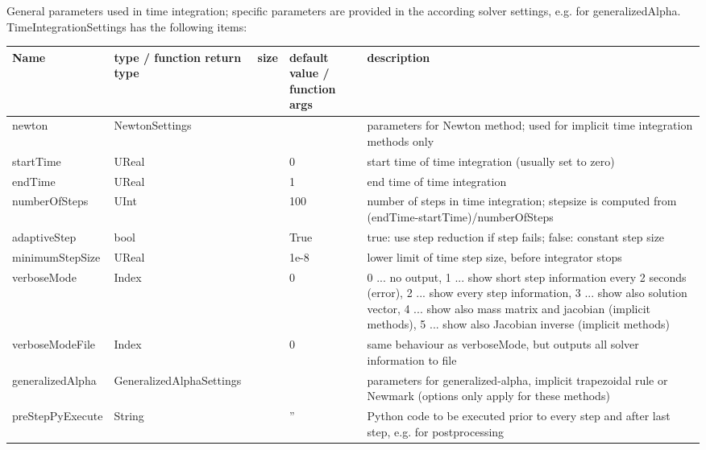  \label{sec_TimeIntegrationSettings}
General parameters used in time integration; specific parameters are provided in the according solver settings, e.g. for generalizedAlpha.\\ 
%
TimeIntegrationSettings has the following items:
\begin{center}
  \footnotesize
  \begin{longtable}{| p{4.2cm} | p{2.5cm} | p{0.3cm} | p{3.0cm} | p{6cm} |}
    \hline
    \bf Name & \bf type / function return type & \bf size & \bf default value / function args & \bf description \\ \hline
    newton &     NewtonSettings &      &      &     parameters for Newton method; used for implicit time integration methods only\\ \hline
    startTime &     UReal &      &     0 &     start time of time integration (usually set to zero)\\ \hline
    endTime &     UReal &      &     1 &     end time of time integration\\ \hline
    numberOfSteps &     UInt &      &     100 &     number of steps in time integration; stepsize is computed from (endTime-startTime)/numberOfSteps\\ \hline
    adaptiveStep &     bool &      &     True &     true: use step reduction if step fails; false: constant step size\\ \hline
    minimumStepSize &     UReal &      &     1e-8 &     lower limit of time step size, before integrator stops\\ \hline
    verboseMode &     Index &      &     0 &     0 ... no output, 1 ... show short step information every 2 seconds (error), 2 ... show every step information, 3 ... show also solution vector, 4 ... show also mass matrix and jacobian (implicit methods), 5 ... show also Jacobian inverse (implicit methods)\\ \hline
    verboseModeFile &     Index &      &     0 &     same behaviour as verboseMode, but outputs all solver information to file\\ \hline
    generalizedAlpha &     GeneralizedAlphaSettings &      &      &     parameters for generalized-alpha, implicit trapezoidal rule or Newmark (options only apply for these methods)\\ \hline
    preStepPyExecute &     String &      &     '' &     Python code to be executed prior to every step and after last step, e.g. for postprocessing\\ \hline
	  \end{longtable}
	\end{center}

